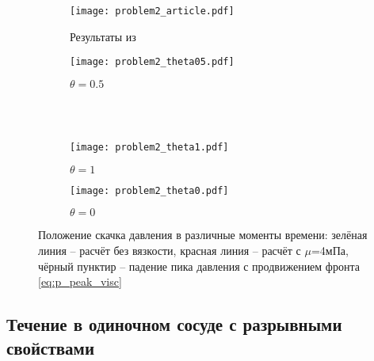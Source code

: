 \begin{figure}[h!]
\begin{subfigure}{0.5\linewidth}\centering
\texttt{[image: problem2\_article.pdf]}
\caption{Результаты из~\cite{boileau:2015}}\label{fig:prob2_a}
\end{subfigure}%
\begin{subfigure}{0.5\linewidth}\centering
\texttt{[image: problem2\_theta05.pdf]}
\caption{$\theta=0.5$}\label{fig:prob2_b}
\end{subfigure} \\
\hfill \\
\begin{subfigure}{0.5\linewidth}\centering
\texttt{[image: problem2\_theta1.pdf]}
\caption{$\theta=1$}\label{fig:prob2_c}
\end{subfigure}%
\begin{subfigure}{0.5\linewidth}\centering
\texttt{[image: problem2\_theta0.pdf]}
\caption{$\theta=0$}\label{fig:prob2_d}
\end{subfigure}%
\caption{Положение скачка давления в различные моменты времени: зелёная линия -- расчёт без вязкости, красная линия -- расчёт с $\mu$=4мПа,
чёрный пунктир -- падение пика давления с продвижением фронта \cref{eq:p_peak_visc}}\label{fig:prob2}
\end{figure}


\subsection{Течение в одиночном сосуде с разрывными свойствами}

